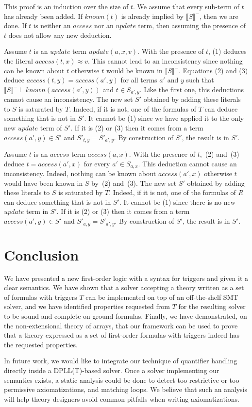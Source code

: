 \documentclass[]{easychair}
\newcommand{\Fm}[1]{\llb #1 \rrb^-}
\newcommand{\K}{\mathit{known}}
\newcommand{\update}{\mathit{update}}
\newcommand{\access}{\mathit{access}}
\newcommand{\llb}{\llbracket} \newcommand{\rrb}{\rrbracket}
\newcommand{\beforesec}{\vspace{0cm}}
\newcommand{\aftersec}{\vspace{0cm}}
\begin{document}
This proof is an induction over the size of $t$. We assume that every
sub-term of $t$ has already been added. If $\K(t)$ is already implied by
$\Fm{S}$, then we are done. If $t$ is neither an $\access$ nor an $\update$
term, then assuming the presence of $t$ does not allow any new deduction.

Assume $t$ is an $\update$ term $\update(a,x,v)$. With the presence of $t$,
(1) deduces the literal $\access(t, x)\approx v$. This
cannot lead to an inconsistency since nothing can be known about $t$ otherwise
$t$ would be known in $\Fm{S}$.
Equations (2) and (3) deduce $\access(t, y)=\access(a', y)$ for all terms $a'$
and $y$ such that $\Fm{S}\vdash\K(\access(a',y))$ and $t\in S_{a',y}$. Like the
first one, this
deductions cannot cause an inconsistency. The new set $S'$ obtained by adding
these literals to $S$ is saturated by $T$. Indeed, if it is not, one of the
formulas of $T$ can deduce something that is not in $S'$. It cannot be (1) since
we have applied it to the only new $\update$ term of $S'$. If it is (2) or (3)
then it comes from a term $\access(a',y)\in S'$ and $S'_{t,y}=S'_{a',y}$. By
construction of $S'$, the result is in $S'$.

Assume $t$ is an $\access$ term $\access(a,x)$. With the presence of $t$,~(2)
and~(3) deduce $t=\access(a', x)$ for every $a'\in S_{a,x}$. This
deduction cannot cause an inconsistency. Indeed, nothing can be known about
$\access(a',x)$ otherwise $t$ would have been known in $S$ by~(2) and~(3). The
new set
$S'$ obtained by adding these literals to $S$ is saturated by $T$. Indeed, if it
is not, one of the formulas of $R$ can deduce something that is not in $S'$. It
cannot be (1) since there is no new $\update$ term in $S'$. If it is (2) or (3)
then it comes from a term $\access(a',y)\in S'$ and $S'_{a,y}=S'_{a',y}$. By
construction of $S'$, the result is in $S'$.

\beforesec
\section{Conclusion}
\aftersec

We have presented a new first-order logic with a syntax for triggers and given
it a clear semantics. We have shown that a solver accepting a theory written as
a set of formulas with triggers $T$ can be implemented on top of an
off-the-shelf SMT solver, and we have identified properties requested from $T$
for the resulting solver to be sound and complete on ground formulas. Finally,
we have demonstrated, on the
non-extensional theory of arrays, that our framework can be used to
prove that a theory expressed as a set of first-order formulas with triggers
indeed has the requested properties.

In future work, we would like to integrate our technique of quantifier
handling directly inside a DPLL(T)-based solver. Once a solver implementing our
semantics exists, a
static analysis could be done to detect too restrictive or too
permissive axiomatizations, and matching loops. We believe that such an
analysis will help theory designers avoid common pitfalls when writing
axiomatizations.


\beforesec


\end{document}
